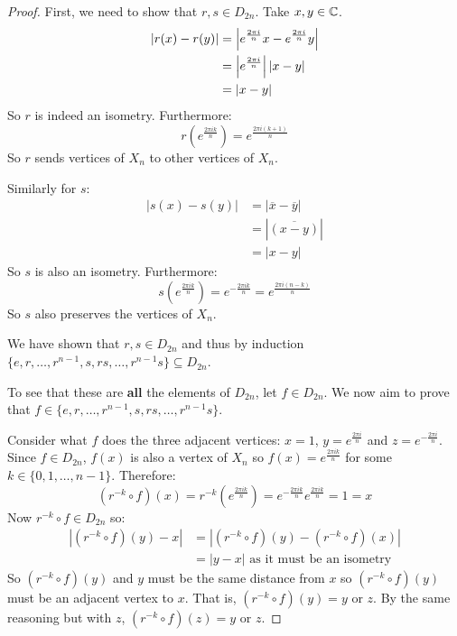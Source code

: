 \documentclass[../main.tex]{subfiles}
\begin{document}
\begin{proof}
  First, we need to show that $r, s \in D_{2n}$.
  Take $x, y \in \mathbb{C}$.
  \begin{align*}
    |r(x) - r(y)| &= \left\lvert e^{\frac{2\pi i}{n}}x - e^{\frac{2\pi i}{n}}y \right\rvert \\
                  &= \left\lvert e^{\frac{2\pi i}{n}} \right\rvert|x - y| \\
                  &= |x - y|
  \end{align*}
  So $r$ is indeed an isometry.
  Furthermore:
  \[
    r\left(e^{\frac{2 \pi i k}{n}}\right) = e^{\frac{2\pi i(k+1)}{n}}
  \]
  So $r$ sends vertices of $X_n$ to other vertices of $X_n$.

  Similarly for $s$:
  \begin{align*}
    |s(x) - s(y)| &= |\overline{x} - \overline{y}| \\
                  &= |\overline{(x - y)}| \\
                  &= |x - y|
  \end{align*}
  So $s$ is also an isometry.
  Furthermore:
  \[
    s\left(e^{\frac{2\pi i k}{n}}\right) = e^{-\frac{2\pi ik}{n}} = e^{\frac{2\pi i (n-k)}{n}}
  \]
  So $s$ also preserves the vertices of $X_n$.

  We have shown that $r, s \in D_{2n}$ and thus by induction $\{e, r, \ldots, r^{n-1}, s, rs, \ldots, r^{n-1}s\} \subseteq D_{2n}$.

  To see that these are \textbf{all} the elements of $D_{2n}$, let $f \in D_{2n}$.
  We now aim to prove that $f \in \{e, r, \ldots, r^{n-1}, s, rs, \ldots, r^{n-1}s\}$.

  Consider what $f$ does the three adjacent vertices: $x = 1$, $y = e^{\frac{2\pi i}{n}}$ and $z =e^{-\frac{2\pi i}{n}}$.
  Since $f \in D_{2n}$, $f(x)$ is also a vertex of $X_n$ so $f(x) = e^{\frac{2\pi i k}{n}}$ for some $k \in \{0, 1, \ldots, n-1\}$.
  Therefore:
  \[
    (r^{-k} \circ f)(x) = r^{-k}(e^{\frac{2 \pi i k}{n}}) = e^{-\frac{2\pi i k}{n}} e^{\frac{2 \pi i k}{n}} = 1 = x
  \]
  Now $r^{-k} \circ f \in D_{2n}$ so:
  \begin{align*}
    |(r^{-k} \circ f)(y) - x| &= |(r^{-k} \circ f)(y) - (r^{-k} \circ f)(x)| \\
                              &= |y - x| \text{ as it must be an isometry}
  \end{align*}
  So $(r^{-k} \circ f)(y)$ and $y$ must be the same distance from $x$ so $(r^{-k} \circ f)(y)$ must be an adjacent vertex to $x$.
  That is, $(r^{-k} \circ f)(y) = y \text{ or } z$.
  By the same reasoning but with $z$, $(r^{-k} \circ f)(z) = y \text{ or }z$.


\end{proof}
\end{document}
